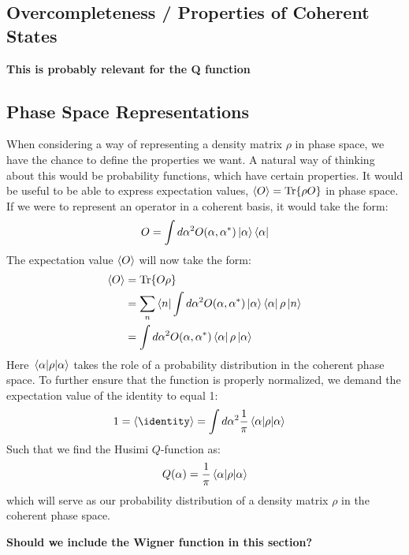 \subsection{Overcompleteness / Properties of Coherent States}
\textbf{This is probably relevant for the Q function} 

\subsection{Phase Space Representations}
When considering a way of representing a density matrix $\rho$ in phase space, we have the chance to define the properties we want. A natural way of thinking about this would be probability functions, which have certain properties. It would be useful to be able to express expectation values, $\expval{O} = \Tr{\rho O }$ in phase space. If we were to represent an operator in a coherent basis, it would take the form:
\begin{equation}
    O = \int d\alpha^2 O(\alpha, \alpha^*)\ket{\alpha}\bra{\alpha} 
\end{equation}
The expectation value $\expval{O}$ will now take the form: 
\begin{align*}
    \expval{O} &= \Tr{O \rho} \\
               &= \sum_n \bra{n} \int d\alpha^2 O(\alpha, \alpha^*)\ket{\alpha}\bra{\alpha} \rho \ket{n} \\
               &= \int d\alpha^2 O(\alpha, \alpha^*)\bra{\alpha} \rho \ket{\alpha}
\end{align*}
Here $\mel{\alpha}{\rho}{\alpha}$ takes the role of a probability distribution in the coherent phase space. To further ensure that the function is properly normalized, we demand the expectation value of the identity to equal 1:
\begin{align*}
    1 = \expval{\identity} &= \int d\alpha^2 \frac{1}{\pi} \mel{\alpha}{\rho}{\alpha}
\end{align*}
Such that we find the Husimi $Q$-function as:
\begin{equation}
    Q(\alpha) =  \frac{1}{\pi} \mel{\alpha}{\rho}{\alpha}
\end{equation}
which will serve as our probability distribution of a density matrix $\rho$ in the coherent phase space.

\textbf{Should we include the Wigner function in this section? }

